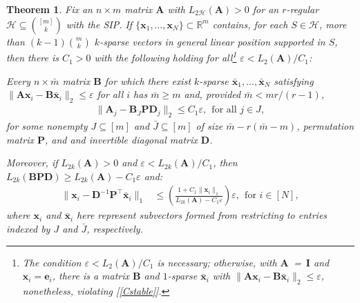 \documentclass[9pt,twocolumn]{pnas-new}
\newtheorem{theorem}{Theorem}
\renewcommand{\eqref}[1]{\textnormal{[\ref{#1}]}}
\begin{document}
\begin{theorem}\label{DeterministicUniquenessTheorem}
Fix an $n \times m$ matrix $\mathbf{A}$ with $L_{2\mathcal{H}}(\mathbf{A}) > 0$ for an $r$-regular $\mathcal{H} \subseteq {[m] \choose k}$ with the SIP. If \mbox{$\{\mathbf{x}_1, \ldots, \mathbf{x}_N\} \subset \mathbb{R}^m$} contains, for each $S \in \mathcal{H}$, more than $(k-1){m \choose k}$ $k$-sparse vectors in general linear position supported in $S$, then there is $C_1 > 0$ with the following holding for all\footnote{The condition $\varepsilon < L_2(\mathbf{A}) /C_1$ is necessary; otherwise,  with \mbox{$\mathbf{A}$ = $\mathbf{I}$} and $\mathbf{x}_i = \mathbf{e}_i$, there is a matrix $\mathbf{B}$ and $1$-sparse $\mathbf{\bar{x}}_i$ with $\|\mathbf{A}\mathbf{x}_i - \mathbf{B}\mathbf{\bar{x}}_i \|_2 \leq \varepsilon$, nonetheless, violating \eqref{Cstable}.} $\varepsilon < L_{2}(\mathbf{A}) / C_1$:

Every $n \times \bar m$ matrix $\mathbf{B}$ for which there exist $k$-sparse $\mathbf{\bar x}_1, \ldots, \mathbf{\bar x}_N$ satisfying \mbox{$\|\mathbf{A}\mathbf{x}_i - \mathbf{B}\mathbf{\bar x}_i\|_2 \leq \varepsilon$} for all $i$ has $\bar m \geq m$ and, provided $\bar m < mr/(r-1)$,
\begin{align}\label{Cstable}
\|\mathbf{A}_j- \mathbf{B}_{\bar J} \mathbf{PD}_j\|_2 \leq C_1 \varepsilon, \ \ \text{for all } j \in J,
\end{align}
%
for some nonempty $J \subseteq [m]$ and $\bar J \subseteq [m]$ of size $\bar m - r(\bar m - m)$, permutation matrix $\mathbf{P}$, and and invertible diagonal matrix $\mathbf{D}$. 

Moreover, if $L_{2k}(\mathbf{A}) > 0$ and $\varepsilon < L_{2k}(\mathbf{A}) / C_1$, then $L_{2k}(\mathbf{B}\mathbf{PD}) \geq L_{2k}(\mathbf{A}) - C_1 \varepsilon$ and:
\begin{align}\label{b-PDa}
\|\mathbf{x}_i - \mathbf{D}^{-1}\mathbf{P}^{\top}\mathbf{\bar x}_i\|_1 &\leq  \left( \frac{ 1+C_1 \|\mathbf{x}_i\|_1 }{ L_{2k}(\mathbf{A}) -  C_1\varepsilon } \right) \varepsilon, \ \  \text{for $i \in [N]$},
\end{align}
%
where $\mathbf{x}_i$ and $\mathbf{\bar x}_i$ here represent subvectors formed from restricting to entries indexed by $J$ and $\bar J$, respectively. 
\end{theorem}
\end{document}
